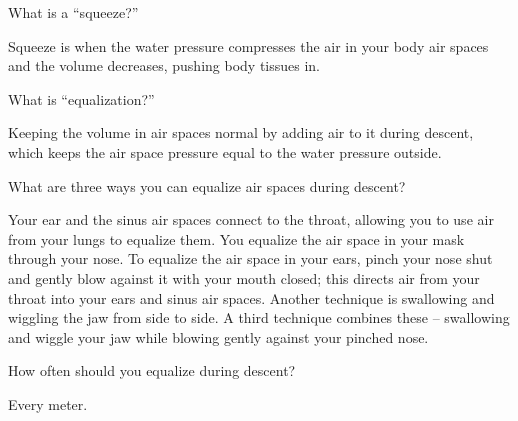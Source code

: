 	\begin{qanda}
		\begin{question}
What is a ``squeeze?''
		\end{question}

		\begin{answer}
Squeeze is when  the water pressure compresses the air in your body air spaces and the volume decreases, pushing body tissues in.
		\end{answer}
	\end{qanda}

	\begin{qanda}
		\begin{question}
What is ``equalization?''
		\end{question}

		\begin{answer}
Keeping the volume in air spaces normal by adding air to it during descent, which keeps the air space pressure equal to the water pressure outside.
		\end{answer}
	\end{qanda}

	\begin{qanda}
		\begin{question}
What are three ways you can equalize air spaces during descent?
		\end{question}

		\begin{answer}
Your ear and the sinus air spaces connect to the throat, allowing you to use air from your lungs to equalize them.  You equalize the air space in your mask through your nose.  To equalize the air space in your ears, pinch your nose shut and gently blow against it with your mouth closed; this directs air from your throat into your ears and sinus air spaces.  Another technique is swallowing and wiggling the jaw from side to side.  A third technique combines these -- swallowing and wiggle your jaw while blowing gently against your pinched nose.
		\end{answer}
	\end{qanda}

	\begin{qanda}
		\begin{question}
How often should you equalize during descent?
		\end{question}

		\begin{answer}
Every meter.
		\end{answer}
	\end{qanda}

